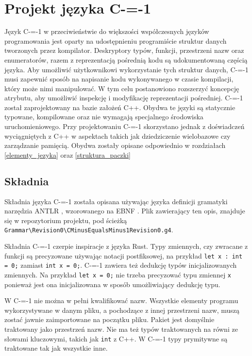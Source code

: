 \section{Projekt języka C-=-1}
\label{Language_desig}

Język C-=-1 w przeciwieństwie do większości współczesnych języków programowania jest oparty na udostępnieniu programiście struktur danych tworzonych przez kompilator. Deskryptory typów, funkcji, przestrzeni nazw oraz enumeratorów, razem z reprezentacją pośrednią kodu są udokumentowaną częścią języka.
Aby umożliwić użytkownikowi wykorzystanie tych struktur danych, C-=-1 musi zapewnić sposób na napisanie kodu wykonywanego w czasie kompilacji, który może nimi manipulować. W tym celu postanowiono rozszerzyć koncepcję atrybutu, aby umożliwić inspekcję i modyfikację reprezentacji pośredniej.
C-=-1 został zaprojektowany na bazie założeń C++. Obydwa te języki są statycznie typowane, kompilowane oraz nie wymagają specjalnego środowiska uruchomieniowego.
Przy projektowaniu C-=-1 skorzystano jednak z doświadczeń wyciągniętych z C++ w aspektach takich jak dziedziczenie wielobazowe czy zarządzanie pamięcią. Obydwa zostały opisane odpowiednio w rozdziałach \ref{elementy_jezyka} oraz \ref{struktura_paczki}

\subsection{Składnia}

Składnia języka C-=-1 została opisana używając języka definicji gramatyki narzędzia ANTLR \cite{antlr}, wzorowanego na EBNF \cite{ebnf}.
Plik zawierający ten opis, znajduje się w repozytorium projektu, pod ścieżką \lstinline{Grammar\Revision0\CMinusEqualsMinus1Revision0.g4}.

Składnia C-=-1 czerpie inspiracje z języka Rust.
Typy zmiennych, czy zwracane z funkcji są precyzowane używając notacji postfiksowej, na przykład \lstinline{let x : int = 0;} zamiast \lstinline{int x = 0;}.
C-=-1 zawiera też dedukcję typów inicjalizowanych zmiennych.
Na przykład \lstinline{let x = 0;} nie trzeba precyzować typu zmiennej \lstinline{x} ponieważ jest ona inicjalizowana w sposób umożliwiający dedukcję typu.

W C-=-1 nie można w pełni kwalifikować nazw.
Wszystkie elementy programu wykorzystywane w danym pliku, a pochodzące z innej przestrzeni nazw, muszą zostać jawnie zaimportowane na początku pliku.
Pakiet jest domyślnie traktowany jako przestrzeń nazw.
Nie ma też typów traktowanych na równi ze słowami kluczowymi, takich jak \lstinline{int} z C++.
W C-=-1 typy prymitywne są traktowane tak jak wszystkie inne.

